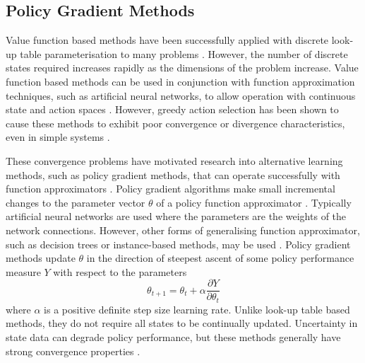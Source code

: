 \subsection{Policy Gradient Methods}
\label{sec:policygradient}
Value function based methods have been successfully applied with discrete
look-up table parameterisation to many problems \cite{kaelbling:1996}.  However,
the number of discrete states required increases rapidly as the dimensions of
the problem increase.
Value function based methods can be used in conjunction with function
approximation techniques, such as artificial neural networks, to allow operation
with continuous state and action spaces \cite{sutton:1996}.  However, greedy
action selection has been shown to cause these methods to exhibit poor
convergence or divergence characteristics, even in simple systems
\cite{tsitsiklis:94,peters:enac,gordon:95,baird:95}.

These convergence problems have motivated research into alternative learning
methods, such as policy gradient methods, that can operate successfully with
function approximators \cite{peters:enac}. Policy gradient algorithms make small
incremental changes to the parameter vector $\theta$ of a policy function
approximator \cite{sutton:2000}. Typically artificial neural networks are used
where the parameters are the weights of the network connections. However,
other forms of generalising function approximator, such as decision trees or
instance-based methods, may be used \cite{barto:policy}.  Policy
gradient methods update $\theta$ in the direction of steepest ascent of some
policy performance measure $Y$ with respect to the parameters
\begin{equation}
\theta_{t+1} = \theta_t + \alpha \frac{\partial Y}{\partial \theta_t}
\end{equation}
where $\alpha$ is a positive definite step size learning rate.  Unlike look-up
table based methods, they do not require all states to be continually updated.
Uncertainty in state data can degrade policy performance, but these methods
generally have strong convergence properties \cite{sutton:2000}.


